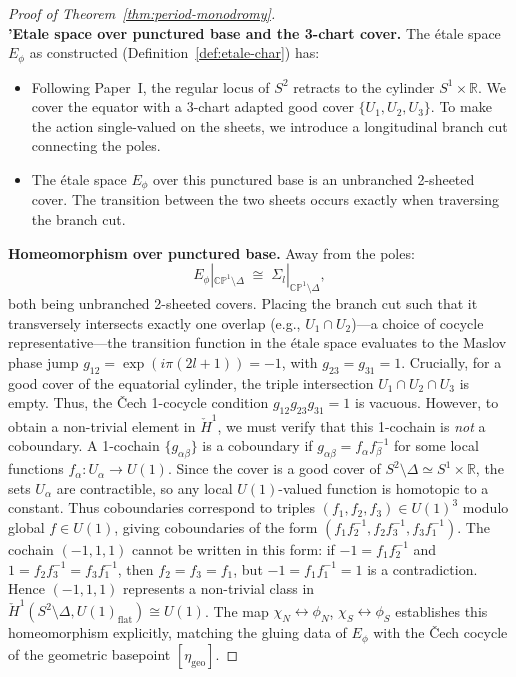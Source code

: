 \documentclass[11pt]{article}
\begin{document}
\begin{proof}[Proof of Theorem~\ref{thm:period-monodromy}]
\textbf{\\'Etale space over punctured base and the 3-chart cover.} The étale space $E_\phi$ as
constructed (Definition~\ref{def:etale-char}) has:
\begin{itemize}
  \item Following Paper~I, the regular locus of $S^2$ retracts to the cylinder $S^1 \times \mathbb{R}$. We cover the equator with a 3-chart adapted good cover $\{U_1, U_2, U_3\}$. To make the action single-valued on the sheets, we introduce a longitudinal branch cut connecting the poles.
  \item The \'etale space $E_\phi$ over this punctured base is an unbranched 2-sheeted cover. The transition between the two sheets occurs exactly when traversing the branch cut.
\end{itemize}

\textbf{Homeomorphism over punctured base.} Away from the poles:
\[
  E_\phi|_{\mathbb{CP}^1 \setminus \Delta}
  \;\cong\;
  \Sigma_l|_{\mathbb{CP}^1 \setminus \Delta},
\]
both being unbranched 2-sheeted covers.
Placing the branch cut such that it transversely intersects exactly one overlap (e.g., $U_1 \cap U_2$)---a choice of cocycle representative---the transition function in the \'etale space evaluates to the Maslov phase jump $g_{12} = \exp(i\pi(2l+1)) = -1$, with $g_{23} = g_{31} = 1$.
Crucially, for a good cover of the equatorial cylinder, the triple intersection $U_1 \cap U_2 \cap U_3$ is empty. Thus, the \v{C}ech 1-cocycle condition $g_{12}g_{23}g_{31} = 1$ is vacuous.
However, to obtain a non-trivial element in $\check{H}^1$, we must verify that this 1-cochain is \emph{not} a coboundary. A 1-cochain $\{g_{\alpha\beta}\}$ is a coboundary if $g_{\alpha\beta} = f_\alpha f_\beta^{-1}$ for some local functions $f_\alpha: U_\alpha \to U(1)$. Since the cover is a good cover of $S^2 \setminus \Delta \simeq S^1 \times \mathbb{R}$, the sets $U_\alpha$ are contractible, so any local $U(1)$-valued function is homotopic to a constant. Thus coboundaries correspond to triples $(f_1, f_2, f_3) \in U(1)^3$ modulo global $f \in U(1)$, giving coboundaries of the form $(f_1f_2^{-1}, f_2f_3^{-1}, f_3f_1^{-1})$. The cochain $(-1, 1, 1)$ cannot be written in this form: if $-1 = f_1f_2^{-1}$ and $1 = f_2f_3^{-1} = f_3f_1^{-1}$, then $f_2 = f_3 = f_1$, but $-1 = f_1f_1^{-1} = 1$ is a contradiction. Hence $(-1, 1, 1)$ represents a non-trivial class in $\check{H}^1(S^2 \setminus \Delta, U(1)_{\mathrm{flat}}) \cong U(1)$.
The map $\chi_N \leftrightarrow \phi_N$, $\chi_S \leftrightarrow \phi_S$ establishes this homeomorphism explicitly, matching the gluing data of $E_\phi$ with the \v{C}ech cocycle of the geometric basepoint $[\eta_{\mathrm{geo}}]$.


\end{proof}
\end{document}
